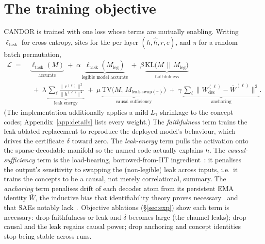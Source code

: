 \documentclass[11pt]{article}
\begin{document}
\section{The training objective}
\label{sec:obj}
CANDOR is trained with one loss whose terms are mutually enabling. Writing
$\ell_{\mathrm{task}}$ for cross-entropy, $\mathrm{sites}$ for the per-layer
$(h,\hat h,r,c)$, and $\pi$ for a random batch permutation,
\begin{equation*}
\begin{split}
\mathcal{L} \;=\;&
\underbrace{\ell_{\mathrm{task}}(M)}_{\text{accurate}}
\;+\;\alpha\,\underbrace{\ell_{\mathrm{task}}(M_{\mathrm{leg}})}_{\text{legible model accurate}}
\;+\;\beta\,\underbrace{\mathrm{KL}\!\big(M \,\|\, M_{\mathrm{leg}}\big)}_{\text{faithfulness}} \\[4pt]
&\;+\;\lambda\,\underbrace{\textstyle\sum_\ell \tfrac{\|r^{(\ell)}\|^2}{\|h^{(\ell)}\|^2}}_{\text{leak energy}}
\;+\;\mu\,\underbrace{\mathrm{TV}\!\big(M,\,M_{\mathrm{leak\text{-}swap}(\pi)}\big)}_{\text{causal sufficiency}}
\;+\;\gamma\,\underbrace{\textstyle\sum_\ell\|W_{\mathrm{dec}}^{(\ell)}-\bar W^{(\ell)}\|^2}_{\text{anchoring}} .
\end{split}
\end{equation*}
(The implementation additionally applies a mild $L_1$ shrinkage to the concept codes;
Appendix~\ref{app:details} lists every weight.) The \emph{faithfulness} term trains the
leak-ablated replacement to reproduce the
deployed model's behaviour, which drives the certificate $\delta$ toward zero. The
\emph{leak-energy} term pulls the activation onto the sparse-decodable manifold so the
named code actually explains $h$. The \emph{causal-sufficiency} term is the load-bearing,
borrowed-from-IIT ingredient~\citep{geiger2022iit,chan2022causalscrubbing}: it penalises
the output's sensitivity to swapping the (non-legible) leak across inputs, i.e.\ it
trains the concepts to be a causal, not merely correlational, summary. The
\emph{anchoring} term penalises drift of each decoder atom from its persistent EMA
identity $\bar W$, the inductive bias that identifiability theory proves
necessary~\citep{locatello2019challenging} and that SAEs notably
lack~\citep{leask2025canonical}. Objective ablations (\S\ref{sec:exp}) show each
term is necessary: drop faithfulness or leak and $\delta$ becomes large (the channel
leaks); drop causal and the leak regains causal power; drop anchoring and concept
identities stop being stable across runs.
\end{document}
